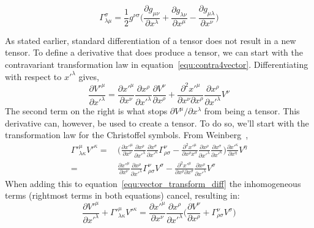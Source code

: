 \begin{equation}
    \Gamma^{\sigma}_{\lambda\mu} = \frac{1}{2}g^{\nu\sigma}\bigg(\frac{\partial g_{\mu\nu}}{\partial x^{\lambda}} + \frac{\partial g_{\lambda\nu}}{\partial x^{\mu}} - \frac{\partial g_{\mu\lambda}}{\partial x^{\nu}}\bigg)
\end{equation}

As stated earlier, standard differentiation of a tensor does not result in a new tensor. To define a derivative that does produce a tensor, we can start with the contravariant transformation law in equation~\ref{equ:contra4vector}. Differentiating with respect to $x'^{\lambda}$ gives,
\begin{equation}
\label{equ:vector_transform_diff}
    \frac{\partial V'^{\mu}}{\partial x'^{\lambda}} = \frac{\partial x'^{\mu}}{\partial x^{\nu}} \frac{\partial x^{\rho}}{\partial x'^{\lambda}} \frac{\partial V^{\nu}}{\partial x^{\rho}} + \frac{\partial^{2}x'^{\mu}}{\partial x^{\nu}\partial x^{\rho}} \frac{\partial x^{\rho}}{\partial x'^{\lambda}} V^{\nu}
\end{equation}
The second term on the right is what stops $\partial V^{\mu}/\partial x^{\lambda}$ from being a tensor. This derivative can, however, be used to create a tensor. To do so, we'll start with the transformation law for the Christoffel symbols. From Weinberg~\cite{weinberg1972gravitation},
\begin{equation}
    \begin{split}
    \Gamma'^{\mu}_{\lambda\kappa}V'^{\kappa} =& \,\bigg( \frac{\partial x'^{\mu}}{\partial x^{\nu}} \frac{\partial x^{\rho}}{\partial x'^{\lambda}} \frac{\partial x^{\sigma}}{\partial x'^{\kappa}} \Gamma^{\nu}_{\rho\sigma} - \frac{\partial^{2}x'^{\mu}}{\partial x^{\rho}x^{\sigma}} \frac{\partial x^{\rho}}{\partial x'^{\lambda}} \frac{\partial x^{\sigma}}{\partial x'^{\kappa}} \bigg) \frac{\partial x'^{\kappa}}{\partial x^{\eta}}V^{\eta} \\
    =& \,\frac{\partial x'^{\mu}}{\partial x^{\nu}} \frac{\partial x^{\rho}}{\partial x'^{\lambda}} \Gamma^{\nu}_{\rho\sigma}V^{\sigma} - \frac{\partial^{2}x'^{\mu}}{\partial x^{\rho}\partial x^{\sigma}} \frac{\partial x^{\rho}}{\partial x'^{\lambda}}V^{\sigma}
    \end{split}
\end{equation}
When adding this to equation~\ref{equ:vector_transform_diff} the inhomogeneous terms (rightmost terms in both equations) cancel, resulting in:
\begin{equation}
    \frac{\partial V'^{\mu}}{\partial x'^{\lambda}} + \Gamma'^{\mu}_{\lambda\kappa}V'^{\kappa} = \frac{\partial x'^{\mu}}{\partial x^{\nu}} \frac{\partial x^{\rho}}{\partial x'^{\lambda}} \bigg(\frac{\partial V^{\nu}}{\partial x^{\rho}} + \Gamma^{\nu}_{\rho\sigma}V^{\sigma} \bigg)
\end{equation}

